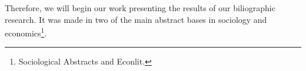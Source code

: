 \documentclass[a4paper, 12pt, openright, oneside, german, french, brazil, english]{abntex2}
\begin{document}

	Therefore, we will begin our work presenting the results of our biliographic research. It was made in two of the main abstract bases in sociology and economics\footnote{Sociological Abstracts and Econlit.}.


	

\end{document}
